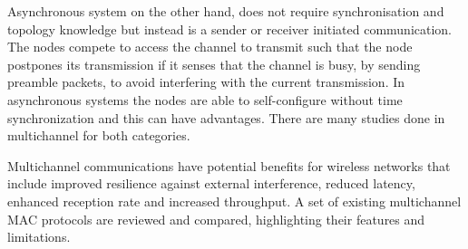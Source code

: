 
Asynchronous system on the other hand, does not require synchronisation and topology knowledge but instead is a sender or receiver initiated communication. The nodes compete to access the channel to transmit such that the node postpones its transmission if it senses that the channel is busy, by sending preamble packets, to avoid interfering with the current transmission. In asynchronous systems the nodes are able to self-configure without time synchronization and this can have advantages. There are many studies done in multichannel for both categories.

Multichannel communications have potential benefits for wireless networks that include improved resilience against external interference, reduced latency, enhanced reception rate and increased throughput. A set of existing multichannel MAC protocols are reviewed and compared, highlighting their features and limitations.



